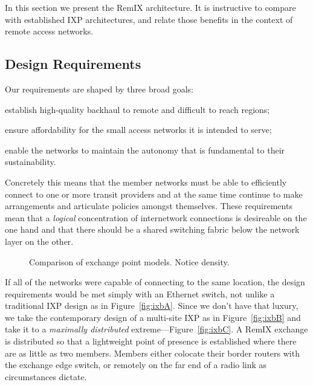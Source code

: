 In this section we present the RemIX architecture. It is instructive
to compare with established IXP architectures, and relate those
benefits in the context of remote access networks.

\subsection{Design Requirements}

Our requirements are shaped by three broad goals:
\begin{inparaenum}[(i)]
  \item establish high-quality backhaul to remote and difficult to
    reach regions;
  \item ensure affordability for the small access networks it is
    intended to serve;
  \item enable the networks to maintain the autonomy that is
    fundamental to their sustainability.
\end{inparaenum}
Concretely this means that the member networks must be able to
efficiently connect to one or more transit providers and at the same
time continue to make arrangements and articulate policies amongst
themselves. These requirements mean that a \emph{logical}
concentration of internetwork connections is desireable on the one
hand and that there should be a shared switching fabric below the
network layer on the other.

\begin{figure*}
   \hfill
   \hfill
  \subfloat[RemIX]{
    \resizebox{0.6\columnwidth}{!}{
      \begin{tikzpicture}
        \ixboxesC
      \end{tikzpicture}
      \label{fig:ixbC}
    }
  }
  \caption{Comparison of exchange point models. Notice density.}
  \label{fig:ixb}
\end{figure*}

If all of the networks were capable of connecting to the same
location, the design requirements would be met simply with an Ethernet
switch, not unlike a traditional \ac{IXP} design as in
Figure~\ref{fig:ixbA}. Since we don't have that luxury, we take the
contemporary design of a multi-site \ac{IXP} as in
Figure~\ref{fig:ixbB} and take it to a \emph{maximally distributed}
extreme---Figure~\ref{fig:ixbC}. A RemIX exchange is distributed so
that a lightweight point of presence is established where there are as
little as two members. Members either colocate their border routers
with the exchange edge switch, or remotely on the far end of a radio
link as circumstances dictate.

